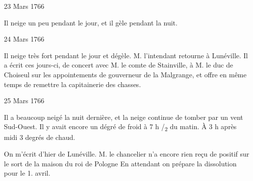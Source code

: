                      \begin{diary}{23 Mars 1766}{}

                         Il neige un peu pendant le jour, et il gèle
                           pendant la nuit. \bigskip


                     \end{diary}

                     \begin{diary}{24 Mars 1766}{}

                         Il neige très fort pendant le jour et
                           dégèle.
                           M. l'intendant retourne à
                              Lunéville. Il a
                           écrit ces jours-ci, de concert avec M. le comte
                              de Stainville, à M. le duc
                              de Choiseul sur les
                           appointements de gouverneur de
                              la Malgrange,
                           et offre en même temps de remettre la capitainerie
                              des chasses. \bigskip


                     \end{diary}

                     \begin{diary}{25 Mars 1766}{}

                         Il a beaucoup neigé la nuit
                           dernière,
                           et la neige continue de tomber par un vent
                           Sud-Ouest. Il y avait encore un dégré de
                              froid
                           à 7 h /\textsubscript{2} du matin. À 3 h après midi
                           3 degrés
                              de chaud. \bigskip


                         On m'écrit d'hier de Lunéville. M. le
                              chancelier n'a encore rien reçu de positif
                           sur le sort de la maison du roi
                              de Pologne
                           En attendant on prépare la dissolution
                           pour le 1.
                              avril. \bigskip


                     \end{diary}

